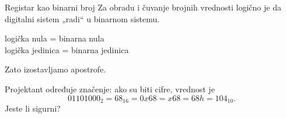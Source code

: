 \begin{frame}[label=04-s025]{Registar kao binarni broj}
Za obradu i čuvanje brojnih vrednosti logično je da digitalni sistem „radi“ u binarnom sistemu.
\begin{center}logička nula = binarna nula\\logička jedinica = binarna jedinica\end{center}
Zato izostavljamo apostrofe.
\par\vspace{1.5mm}{\fontsize{10}{12}\selectfont\renewcommand{\arraystretch}{.95}\par}\par\vspace{1.5mm}
Projektant određuje značenje: ako su biti cifre, vrednost je
\[01101000_2=68_{16}=0x68=x68=68h=104_{10}.\]
\centering\alert{Jeste li sigurni?}
\end{frame}
